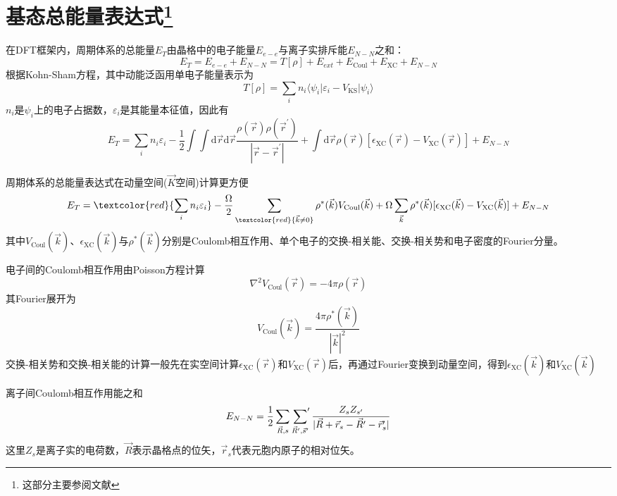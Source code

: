\section{基态总能量表达式\footnote{这部分主要参阅文献}}
在DFT框架内，周期体系的总能量$E_T$由晶格中的电子能量$E_{e-e}$与离子实排斥能$E_{N-N}$之和：
	\begin{equation}
		E_T=E_{e-e}+E_{N-N}=T[\rho]+E_{ext}+E_{\mathrm{Coul}}+E_{\mathrm{XC}}+E_{N-N}
	\end{equation}
根据\textrm{Kohn-Sham}方程，其中动能泛函用单电子能量表示为
\begin{equation}
	T[{\rho}]=\sum_in_i\langle\psi_i|\varepsilon_i-V_{\mathrm{KS}}|\psi_i\rangle
\end{equation}
$n_i$是$\psi_i$上的电子占据数，$\varepsilon_i$是其能量本征值，因此有
\begin{equation}
	E_T=\sum_in_i\varepsilon_i-\dfrac12\int\int\mathrm{d}\vec r\mathrm{d}\vec r\dfrac{\rho(\vec r)\rho(\vec r^{\prime})}{|\vec r-\vec r^{\prime}|}+\int\mathrm{d}\vec r\rho(\vec r)[\epsilon_{\mathrm{XC}}(\vec r)-V_{\mathrm{XC}}(\vec r)]+E_{N-N}
\end{equation}

周期体系的总能量表达式在动量空间($\vec K$空间)计算更方便
\begin{equation}
	E_T=\textcolor{red}{\sum_in_i\varepsilon_i}-\dfrac{\Omega}2\sum_{\textcolor{red}{\vec k\neq 0}}\rho^{\ast}(\vec k)V_{\mathrm{Coul}}(\vec k)+\Omega\sum_{\vec k}\rho^{\ast}(\vec k)[\epsilon_{\mathrm{XC}}(\vec k)-V_{\mathrm{XC}}(\vec k)]+E_{N-N}
\end{equation}
其中$V_{\mathrm{Coul}}(\vec k)$、$\epsilon_{\mathrm{XC}}(\vec k)$与$\rho^{\ast}(\vec k)$分别是\textrm{Coulomb}相互作用、单个电子的交换-相关能、交换-相关势和电子密度的\textrm{Fourier}分量。

电子间的\textrm{Coulomb}相互作用由\textrm{Poisson}方程计算
\begin{equation}
	\nabla^2V_{\mathrm{Coul}}(\vec r)=-4\pi\rho(\vec r)
\end{equation}
其\textrm{Fourier}展开为
\begin{equation}
	V_{\mathrm{Coul}}(\vec k)=\dfrac{4\pi\rho^{\ast}(\vec k)}{|\vec k|^2}
\end{equation}
交换-相关势和交换-相关能的计算一般先在实空间计算$\epsilon_{\mathrm{XC}}(\vec r)$和$V_{\mathrm{XC}}(\vec r)$后，再通过\textrm{Fourier}变换到动量空间，得到$\epsilon_{\mathrm{XC}}(\vec k)$和$V_{\mathrm{XC}}(\vec k)$

离子间\textrm{Coulomb}相互作用能之和
\begin{equation}
		E_{N-N}=\dfrac12\sum_{\vec R,s}\sideset{}{^{\prime}}\sum_{\vec R^{\prime},\vec s^{\prime}}\dfrac{Z_sZ_{s^{\prime}}}{|\vec R+\vec r_s-\vec R^{\prime}-\vec r_s^{\prime}|}
\end{equation}
这里$Z_s$是离子实的电荷数，$\vec R$表示晶格点的位矢，$\vec r_s$代表元胞内原子的相对位矢。


